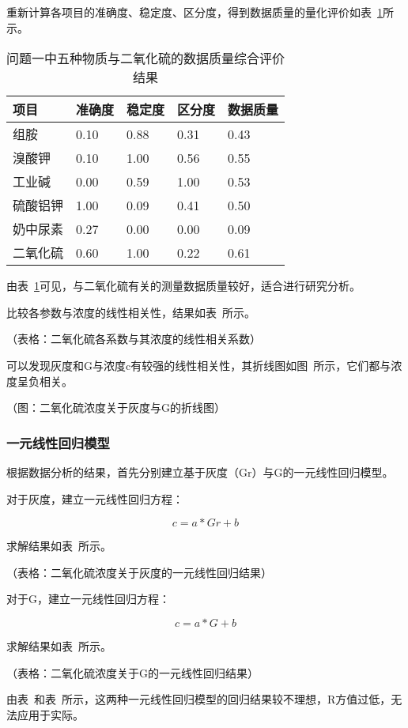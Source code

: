 重新计算各项目的准确度、稳定度、区分度，得到数据质量的量化评价如表~\ref{SO2_Judge}所示。

\begin{table}[]
    \centering
    \caption{问题一中五种物质与二氧化硫的数据质量综合评价结果}
    \label{SO2_Judge}
    \begin{tabular}{@{}lllll@{}}
    \toprule
    项目   & 准确度  & 稳定度  & 区分度  & 数据质量 \\ \midrule
    组胺   & 0.10 & 0.88 & 0.31 & 0.43 \\
    溴酸钾  & 0.10 & 1.00 & 0.56 & 0.55 \\
    工业碱  & 0.00 & 0.59 & 1.00 & 0.53 \\
    硫酸铝钾 & 1.00 & 0.09 & 0.41 & 0.50 \\
    奶中尿素 & 0.27 & 0.00 & 0.00 & 0.09 \\
    二氧化硫 & 0.60 & 1.00 & 0.22 & 0.61 \\ \bottomrule
    \end{tabular}
    \end{table}

由表~\ref{SO2_Judge}可见，与二氧化硫有关的测量数据质量较好，适合进行研究分析。

比较各参数与浓度的线性相关性，结果如表~所示。

（表格：二氧化硫各系数与其浓度的线性相关系数）

可以发现灰度和G与浓度c有较强的线性相关性，其折线图如图~所示，它们都与浓度呈负相关。

（图：二氧化硫浓度关于灰度与G的折线图）

\subsubsection{一元线性回归模型}

根据数据分析的结果，首先分别建立基于灰度（Gr）与G的一元线性回归模型。

对于灰度，建立一元线性回归方程：

$$c=a*Gr+b$$

求解结果如表~所示。

（表格：二氧化硫浓度关于灰度的一元线性回归结果）

对于G，建立一元线性回归方程：

$$c=a*G+b$$

求解结果如表~所示。

（表格：二氧化硫浓度关于G的一元线性回归结果）

由表~和表~所示，这两种一元线性回归模型的回归结果较不理想，R方值过低，无法应用于实际。

